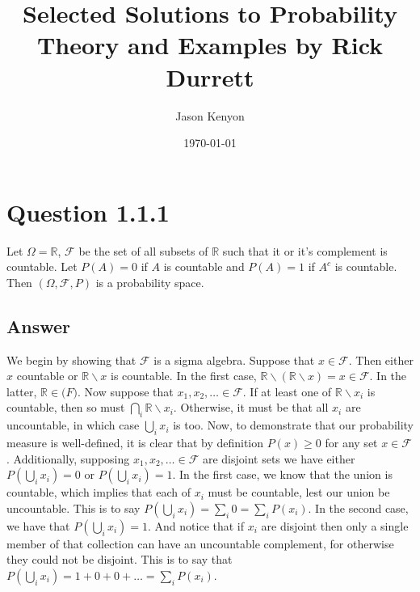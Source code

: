\documentclass[
	12pt, %
]{fphw}
\title{Selected Solutions to Probability Theory and Examples by Rick Durrett} %
\author{Jason Kenyon} %
\date{\today} %
\institute{Binghamton University \\ Department of Mathematics} %
\begin{document}
\maketitle %


\section*{Question 1.1.1}

\begin{problem}
	Let $\Omega=\mathbb{R}$, $\mathcal{F}$ be the set of all subsets of $\mathbb{R}$ such that it or it's complement is countable. Let $P(A)=0$ if $A$ is countable and $P(A)=1$ if $A^{c}$ is countable. Then $(\Omega, \mathcal{F}, P)$ is a probability space.
\end{problem}


\subsection*{Answer}
We begin by showing that $\mathcal{F}$ is a sigma algebra. Suppose that $x \in \mathcal{F}$. Then either $x$ countable or $\mathbb{R} \backslash x$ is countable. In the first case,
$\mathbb{R} \backslash(\mathbb{R} \backslash x)=x \in \mathcal{F}$. 
In the latter, $\mathbb{R} \in \mathcal(F)$. Now suppose that
$x_1, x_2, \dots \in \mathcal{F}$. If at least one of $\mathbb{R} \backslash x_i$ is countable, then
so must $\bigcap_i\mathbb{R} \backslash x_i$. Otherwise, it must be that all $x_i$ are uncountable, in which case $\bigcup_i x_i$ is too. Now, to demonstrate that our probability measure is well-defined, it is clear that by definition $P(x)\geq 0$ for any set $x \in \mathcal{F}$. Additionally, supposing $x_1, x_2, \dots \in \mathcal{F}$ are disjoint sets
we have either $P(\bigcup_ix_i)=0$ or $P(\bigcup_ix_i)=1$. In the first case, we know that the union is countable, which implies that each of $x_i$ must be countable, lest our union be uncountable. This is to say $P(\bigcup_ix_i)=\sum_i0=\sum_iP(x_i)$. In the second case, we have that $P(\bigcup_ix_i)=1$. And notice that if $x_i$ are disjoint then only a single member of that collection can have an uncountable complement, for otherwise they could not be disjoint. This is to say that $P(\bigcup_ix_i)=1+0+0+ \dots=\sum_iP(x_i)$.



\end{document}
